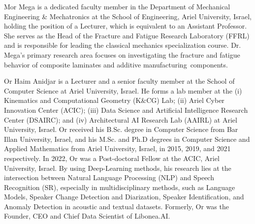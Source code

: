 \documentclass{ieeeaccess}
\begin{document}



\begin{IEEEbiography}{Mor Mega} is a dedicated faculty member in the Department of Mechanical Engineering \& Mechatronics at the School of Engineering, Ariel University, Israel, holding the position of a Lecturer, which is equivalent to an Assistant Professor. She serves as the Head of the Fracture and Fatigue Research Laboratory (FFRL) and is responsible for leading the classical mechanics specialization course.
Dr. Mega's primary research area focuses on investigating the fracture and fatigue behavior of composite laminates and additive manufacturing components.
\end{IEEEbiography}

\begin{IEEEbiography}{Or Haim Anidjar} is a Lecturer and a senior faculty member at the School of Computer Science at Ariel University, Israel. He forms a lab member at the (i) Kinematics and Computational Geometry (K\&CG) Lab; (ii) Ariel Cyber Innovation Center (ACIC); (iii) Data Science and Artificial Intelligence Research Center (DSAIRC); and (iv) Architectural AI Research Lab (AAIRL) at Ariel University, Israel. Or received his B.Sc. degree in Computer Science from Bar Illan University, Israel, and his M.Sc. and Ph.D degrees in Computer Science and Applied Mathematics from Ariel University, Israel, in 2015, 2019, and 2021 respectively. In 2022, Or was a Post-doctoral Fellow at the ACIC, Ariel University, Israel. By using Deep-Learning methods, his research lies at the intersection between Natural Language Processing (NLP) and Speech Recognition (SR), especially in multidisciplinary methods, such as Language Models, Speaker Change Detection and Diarization, Speaker Identification, and Anomaly Detection in acoustic and textual datasets. Formerly, Or was the Founder, CEO and Chief Data Scientist of Libonea.AI.
\end{IEEEbiography}
\end{document}
